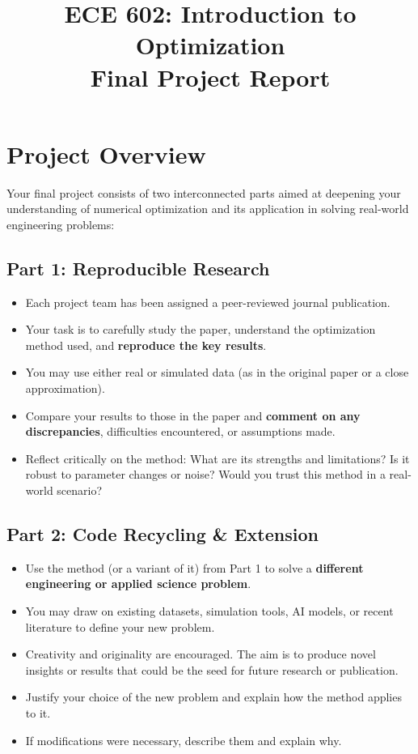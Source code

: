 \documentclass[12pt]{article}
\title{\textbf{ECE 602: Introduction to Optimization} \\ Final Project Report}
\date{}
\begin{document}
\maketitle

\section*{Project Overview}
Your final project consists of two interconnected parts aimed at deepening your understanding of numerical optimization and its application in solving real-world engineering problems:

\subsection*{Part 1: Reproducible Research}
\begin{itemize}
  \item Each project team has been assigned a peer-reviewed journal publication.
  \item Your task is to carefully study the paper, understand the optimization method used, and \textbf{reproduce the key results}.
  \item You may use either real or simulated data (as in the original paper or a close approximation).
  \item Compare your results to those in the paper and \textbf{comment on any discrepancies}, difficulties encountered, or assumptions made.
  \item Reflect critically on the method: What are its strengths and limitations? Is it robust to parameter changes or noise? Would you trust this method in a real-world scenario?
\end{itemize}

\subsection*{Part 2: Code Recycling \& Extension}
\begin{itemize}
  \item Use the method (or a variant of it) from Part 1 to solve a \textbf{different engineering or applied science problem}.
  \item You may draw on existing datasets, simulation tools, AI models, or recent literature to define your new problem.
  \item Creativity and originality are encouraged. The aim is to produce novel insights or results that could be the seed for future research or publication.
  \item Justify your choice of the new problem and explain how the method applies to it.
  \item If modifications were necessary, describe them and explain why.
\end{itemize}
\end{document}
